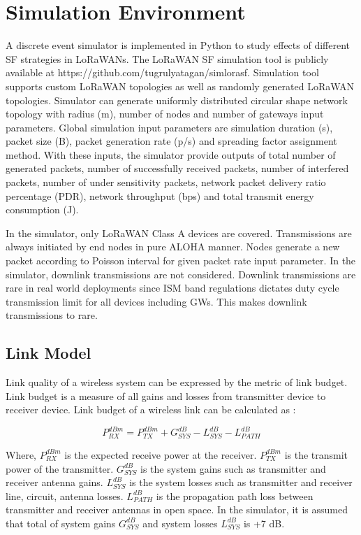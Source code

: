 \documentclass[conference]{IEEEtran}
\begin{document}
\section{Simulation Environment} \label{Simulation Environment}
\par A discrete event simulator is implemented in Python to study effects of different SF strategies in LoRaWANs. The LoRaWAN SF simulation tool is publicly available at https://github.com/tugrulyatagan/simlorasf. Simulation tool supports custom LoRaWAN topologies as well as randomly generated LoRaWAN topologies. Simulator can generate uniformly distributed circular shape network topology with radius (m), number of nodes and number of gateways input parameters. Global simulation input parameters are simulation duration (s), packet size (B), packet generation rate (p/s) and spreading factor assignment method. With these inputs, the simulator provide outputs of total number of generated packets, number of successfully received packets, number of interfered packets, number of under sensitivity packets, network packet delivery ratio percentage (PDR), network throughput (bps) and total transmit energy consumption (J).

\par In the simulator, only LoRaWAN Class A devices are covered. Transmissions are always initiated by end nodes in pure ALOHA manner. Nodes generate a new packet according to Poisson interval for given packet rate input parameter. In the simulator, downlink transmissions are not considered. Downlink transmissions are rare in real world deployments since ISM band regulations dictates duty cycle transmission limit for all devices including GWs. This makes downlink transmissions to rare.

\subsection{Link Model}
\par Link quality of a wireless system can be expressed by the metric of link budget. Link budget is a measure of all gains and losses from transmitter device to receiver device. Link budget of a wireless link can be calculated as \cite{AN1200.22}:

\begin{equation} \label{eq:expected_rx_power}
P^{dBm}_{RX} = P^{dBm}_{TX} + G^{dB}_{SYS} - L^{dB}_{SYS} - L^{dB}_{PATH}
\end{equation}

\par Where, $P^{dBm}_{RX}$ is the expected receive power at the receiver. $P^{dBm}_{TX}$ is the transmit power of the transmitter. $G^{dB}_{SYS}$ is the system gains such as transmitter and receiver antenna gains. $L^{dB}_{SYS}$ is the system losses such as transmitter and receiver line, circuit, antenna losses. $L^{dB}_{PATH}$ is the propagation path loss between transmitter and receiver antennas in open space. In the simulator, it is assumed that total of system gains $G^{dB}_{SYS}$ and system losses $L^{dB}_{SYS}$ is +7 dB.
\end{document}
